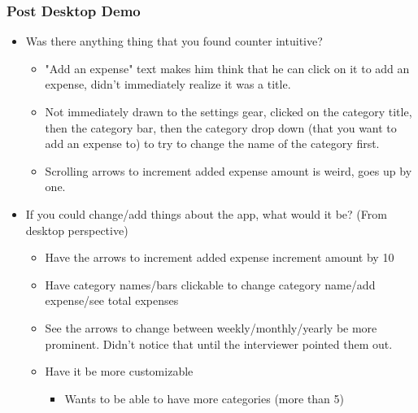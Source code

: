 \documentclass{chi2011}
\begin{document}
\begin{itemize}[noitemsep]
	\subsubsection{Post Desktop Demo}
	\begin{itemize}[noitemsep]
		\item Was there anything thing that you found counter intuitive?
		\begin{itemize}[noitemsep]
			\item "Add an expense" text makes him think that he can click on it to add an expense, didn't
					immediately realize it was a title. 
			\item Not immediately drawn to the settings gear, clicked on the category title, then the 
				  category bar, then the category drop down (that you want to add an expense to) to try to
				  change the name of the category first.
			\item Scrolling arrows to increment added expense amount is weird, goes up by one.
		\end{itemize}
		\item If you could change/add things about the app, what would it be? (From desktop perspective)
		\begin{itemize}[noitemsep]
			\item Have the arrows to increment added expense increment amount by 10
			\item Have category names/bars clickable to change category name/add expense/see total expenses
			\item See the arrows to change between weekly/monthly/yearly be more prominent. Didn't notice 
					that until the interviewer pointed them out. 
			\item Have it be more customizable
			\begin{itemize}[noitemsep]
				\item Wants to be able to have more categories (more than 5)
			\end{itemize}
		\end{itemize}
	\end{itemize}
	

\end{itemize}
\end{document}

